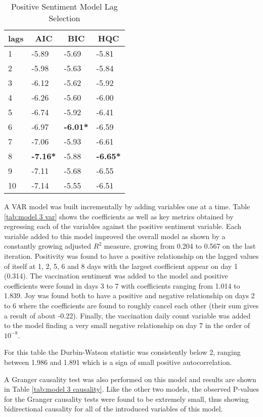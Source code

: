 \begin{table}[H]
\centering
\begin{tabular}{@{}llll@{}}
\toprule
\multicolumn{1}{c}{\textbf{lags}} & \multicolumn{1}{c}{\textbf{AIC}} & \multicolumn{1}{c}{\textbf{BIC}} & \multicolumn{1}{c}{\textbf{HQC}} \\ \midrule
1 & -5.89 & -5.69 & -5.81 \\
2 & -5.98 & -5.63 & -5.84 \\
3 & -6.12 & -5.62 & -5.92 \\
4 & -6.26 & -5.60 & -6.00 \\
5 & -6.74 & -5.92 & -6.41 \\
6 & -6.97 & \textbf{-6.01*} & -6.59 \\
7 & -7.06 & -5.93 & -6.61 \\
8 & \textbf{-7.16*} & -5.88 & \textbf{-6.65*} \\
9 & -7.11 & -5.68 & -6.55 \\
10 & -7.14 & -5.55 & -6.51 \\ \bottomrule
\end{tabular}
\caption{Positive Sentiment Model Lag Selection}
\label{tab:model 3 lag}
\end{table}
 
A VAR model was built incrementally by adding variables one at a time. Table \ref{tab:model 3 var} shows the coefficients as well as key metrics obtained by regressing each of the variables against the positive sentiment variable. Each variable added to this model improved the overall model as shown by a constantly growing adjusted $R^2$ measure, growing from 0.204 to 0.567 on the last iteration. Positivity was found to have a positive relationship on the lagged values of itself at 1, 2, 5, 6 and 8 days with the largest coefficient appear on day 1 (0.314). The vaccination sentiment was added to the model and positive coefficients were found in days 3 to 7 with coefficients ranging from 1.014 to 1.839. Joy was found both to have a positive and negative relationship on days 2 to 6 where the coefficients are found to roughly cancel each other (their sum gives a result of about -0.22). Finally, the vaccination daily count variable was added to the model finding a very small negative relationship on day 7 in the order of $10^{-8}$.

For this table the Durbin-Watson statistic was consistently below 2, ranging between 1.986 and 1.891 which is a sign of small positive autocorrelation.

A Granger causality test was also performed on this model and results are shown in Table \ref{tab:model 3 causality}. Like the other two models, the observed P-values for the Granger causality tests were found to be extremely small, thus showing bidirectional causality for all of the introduced variables of this model.

